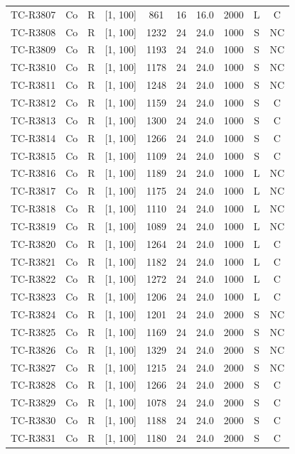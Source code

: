 \begin{longtable}{lccccccccc}
TC-R3807 & Co & R & [1, 100] & 861 & 16 & 16.0 & 2000 & L & C \\
TC-R3808 & Co & R & [1, 100] & 1232 & 24 & 24.0 & 1000 & S & NC \\
TC-R3809 & Co & R & [1, 100] & 1193 & 24 & 24.0 & 1000 & S & NC \\
TC-R3810 & Co & R & [1, 100] & 1178 & 24 & 24.0 & 1000 & S & NC \\
TC-R3811 & Co & R & [1, 100] & 1248 & 24 & 24.0 & 1000 & S & NC \\
TC-R3812 & Co & R & [1, 100] & 1159 & 24 & 24.0 & 1000 & S & C \\
TC-R3813 & Co & R & [1, 100] & 1300 & 24 & 24.0 & 1000 & S & C \\
TC-R3814 & Co & R & [1, 100] & 1266 & 24 & 24.0 & 1000 & S & C \\
TC-R3815 & Co & R & [1, 100] & 1109 & 24 & 24.0 & 1000 & S & C \\
TC-R3816 & Co & R & [1, 100] & 1189 & 24 & 24.0 & 1000 & L & NC \\
TC-R3817 & Co & R & [1, 100] & 1175 & 24 & 24.0 & 1000 & L & NC \\
TC-R3818 & Co & R & [1, 100] & 1110 & 24 & 24.0 & 1000 & L & NC \\
TC-R3819 & Co & R & [1, 100] & 1089 & 24 & 24.0 & 1000 & L & NC \\
TC-R3820 & Co & R & [1, 100] & 1264 & 24 & 24.0 & 1000 & L & C \\
TC-R3821 & Co & R & [1, 100] & 1182 & 24 & 24.0 & 1000 & L & C \\
TC-R3822 & Co & R & [1, 100] & 1272 & 24 & 24.0 & 1000 & L & C \\
TC-R3823 & Co & R & [1, 100] & 1206 & 24 & 24.0 & 1000 & L & C \\
TC-R3824 & Co & R & [1, 100] & 1201 & 24 & 24.0 & 2000 & S & NC \\
TC-R3825 & Co & R & [1, 100] & 1169 & 24 & 24.0 & 2000 & S & NC \\
TC-R3826 & Co & R & [1, 100] & 1329 & 24 & 24.0 & 2000 & S & NC \\
TC-R3827 & Co & R & [1, 100] & 1215 & 24 & 24.0 & 2000 & S & NC \\
TC-R3828 & Co & R & [1, 100] & 1266 & 24 & 24.0 & 2000 & S & C \\
TC-R3829 & Co & R & [1, 100] & 1078 & 24 & 24.0 & 2000 & S & C \\
TC-R3830 & Co & R & [1, 100] & 1188 & 24 & 24.0 & 2000 & S & C \\
TC-R3831 & Co & R & [1, 100] & 1180 & 24 & 24.0 & 2000 & S & C \\

\end{longtable}
